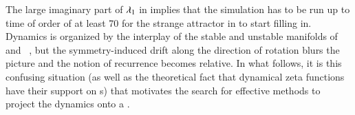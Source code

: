 The large imaginary part of $\eigExp_{1}$ in
 implies that the simulation has to be
run up to time of order of at least 70 for the strange
attractor in  to start filling in. Dynamics
is organized by the interplay of the stable and unstable
manifolds of \eqv\  and \reqv\ , but the
symmetry-induced drift along the direction of rotation blurs
the picture and the notion of recurrence becomes relative. In
what follows, it is this confusing situation (as well as the
theoretical fact that dynamical zeta functions have
their support on \rpo s) that motivates the search for
effective methods to project the dynamics onto a \reducedsp.
